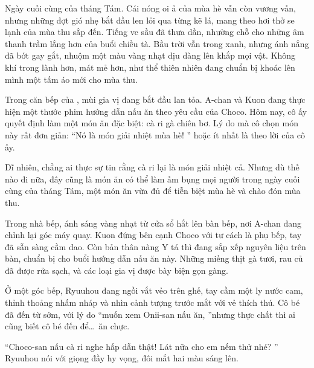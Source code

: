 \documentclass[../main.tex]{subfiles}
\begin{document}

Ngày cuối cùng của tháng Tám. Cái nóng oi ả của mùa hè vẫn còn vương vấn, nhưng những đợt gió nhẹ bắt đầu len lỏi qua từng kẽ lá, mang theo hơi thở se lạnh của mùa thu sắp đến. Tiếng ve sầu đã thưa dần, nhường chỗ cho những âm thanh trầm lắng hơn của buổi chiều tà. Bầu trời vẫn trong xanh, nhưng ánh nắng đã bớt gay gắt, nhuộm một màu vàng nhạt dịu dàng lên khắp mọi vật. Không khí trong lành hơn, mát mẻ hơn, như thể thiên nhiên đang chuẩn bị khoác lên mình một tấm áo mới cho mùa thu.

Trong căn bếp của \hll, mùi gia vị đang bắt đầu lan tỏa. A-chan và Kuon đang thực hiện một thước phim hướng dẫn nấu ăn theo yêu cầu của Choco. Hôm nay, cô ấy quyết định làm một món ăn đặc biệt: cà ri gà chiên bơ. Lý do mà cô chọn món này rất đơn giản: ``Nó là món giải nhiệt mùa hè! '' hoặc ít nhất là theo lời của cô ấy.

Dĩ nhiên, chẳng ai thực sự tin rằng cà ri lại là món giải nhiệt cả. Nhưng dù thế nào đi nữa, đây cũng là món ăn có thể làm ấm bụng mọi người trong ngày cuối cùng của tháng Tám, một món ăn vừa đủ để tiễn biệt mùa hè và chào đón mùa thu.

Trong nhà bếp, ánh sáng vàng nhạt từ cửa sổ hắt lên bàn bếp, nơi A-chan đang chỉnh lại góc máy quay. Kuon đứng bên cạnh Choco với tư cách là phụ bếp, tay đã sẵn sàng cầm dao. Còn bản thân nàng Y tá thì đang sắp xếp nguyên liệu trên bàn, chuẩn bị cho buổi hướng dẫn nấu ăn này. Những miếng thịt gà tươi, rau củ đã được rửa sạch, và các loại gia vị được bày biện gọn gàng.

Ở một góc bếp, Ryuuhou đang ngồi vắt vẻo trên ghế, tay cầm một ly nước cam, thỉnh thoảng nhấm nháp và nhìn cảnh tượng trước mắt với vẻ thích thú. Cô bé đã đến từ sớm, với lý do ``muốn xem Onii-san nấu ăn, ''nhưng thực chất thì ai cũng biết cô bé đến để\dots\ ăn chực.

``Choco-san nấu cà ri nghe hấp dẫn thật! Lát nữa cho em nếm thử nhé? '' Ryuuhou nói với giọng đầy hy vọng, đôi mắt hai màu sáng lên.
\end{document}

